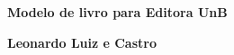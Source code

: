 \thispagestyle{empty}

\begin{center}

\vspace*{\fill}

\textbf{\color{verde_UnB}\fontsize{30pt}{35pt}\selectfont \textbf{Modelo de livro para Editora UnB}}

\vfill

{\textbf{\fontsize{13pt}{15.6pt}\selectfont \centering  Leonardo Luiz e Castro}}



\vspace*{\fill}

\end{center}

\newpage